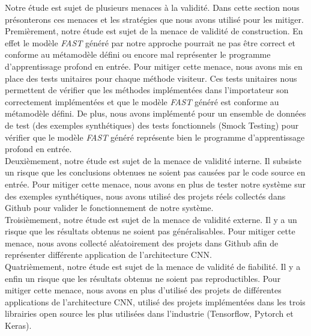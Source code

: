 \label{sec:threats}
Notre étude est sujet de plusieurs menaces à la validité. Dans cette section
nous présonterons ces menaces et les stratégies que nous avons utilisé pour les
mitiger.\\

Premièrement, notre étude est sujet de la menace de validité de construction. En
effet le modèle \emph{FAST} généré par notre approche pourrait ne pas être correct et conforme au métamodèle défini ou encore mal
représenter le programme d'apprentissage profond en entrée. Pour mitiger cette
menace, nous avons mis en place des tests unitaires pour chaque méthode
visiteur. Ces tests unitaires nous permettent de vérifier que les méthodes
implémentées dans l'importateur son correctement implémentées et que le modèle
\emph{FAST} généré est conforme au métamodèle défini. De plus, nous avons implémenté
pour un ensemble de données de test (des exemples synthétiques) des tests
fonctionnels (Smock Testing) pour vérifier que le modèle \emph{FAST} généré représente bien le
programme d'apprentissage profond en entrée.\\

Deuxièmement, notre étude est sujet de la menace de validité interne. Il
subsiste un risque que les conclusions obtenues ne soient pas causées par le
code source en entrée. Pour mitiger cette menace, nous avons en plus de tester
notre système sur des exemples synthétiques, nous avons utilisé des projets
réels collectés dans Github pour valider le fonctionnement de notre système.\\

Troisièmement, notre étude est sujet de la menace de validité externe. Il y a un
risque que les résultats obtenus ne soient pas généralisables. Pour mitiger
cette menace, nous avons collecté aléatoirement des projets dans Github afin de
représenter différente application de l'architecture CNN.\\

Quatrièmement, notre étude est sujet de la menace de validité de fiabilité. Il y
a enfin un risque que les résultats obtenus ne soient pas reproductibles. Pour
mitiger cette menace, nous avons en plus d'utilisé des projets de différentes
applications de l'architecture CNN, utilisé des projets implémentées dans les
trois librairies open source les plus utilisées dans l'industrie (Tensorflow, Pytorch et Keras).



















